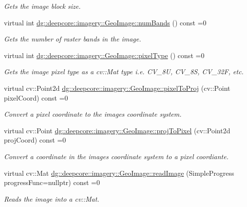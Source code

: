 \begin{DoxyCompactItemize}
\begin{DoxyCompactList}\small\item\em Gets the image block size. \end{DoxyCompactList}\item 
virtual int \hyperlink{group___imagery_module_ga27b0bde15551e580dc658947d7d29f61}{dg\+::deepcore\+::imagery\+::\+Geo\+Image\+::num\+Bands} () const =0
\begin{DoxyCompactList}\small\item\em Gets the number of raster bands in the image. \end{DoxyCompactList}\item 
virtual int \hyperlink{group___imagery_module_ga3cb616a1de3ee19bebfdf14957d90d7c}{dg\+::deepcore\+::imagery\+::\+Geo\+Image\+::pixel\+Type} () const =0
\begin{DoxyCompactList}\small\item\em Gets the image pixel type as a cv\+::\+Mat type i.\+e. C\+V\+\_\+8U, C\+V\+\_\+8S, C\+V\+\_\+32F, etc. \end{DoxyCompactList}\item 
virtual cv\+::\+Point2d \hyperlink{group___imagery_module_ga6ef753bbb1d8a5dfa56a72de21af4f08}{dg\+::deepcore\+::imagery\+::\+Geo\+Image\+::pixel\+To\+Proj} (cv\+::\+Point pixel\+Coord) const =0
\begin{DoxyCompactList}\small\item\em Convert a pixel coordinate to the image\textquotesingle{}s coordinate system. \end{DoxyCompactList}\item 
virtual cv\+::\+Point \hyperlink{group___imagery_module_ga4935502553685c597c803da24f706b99}{dg\+::deepcore\+::imagery\+::\+Geo\+Image\+::proj\+To\+Pixel} (cv\+::\+Point2d proj\+Coord) const =0
\begin{DoxyCompactList}\small\item\em Convert a coordinate in the image\textquotesingle{}s coordinate system to a pixel coordiante. \end{DoxyCompactList}\item 
virtual cv\+::\+Mat \hyperlink{group___imagery_module_ga58e7e5d070e788600714a331c5bdaf02}{dg\+::deepcore\+::imagery\+::\+Geo\+Image\+::read\+Image} (Simple\+Progress progress\+Func=nullptr) const =0
\begin{DoxyCompactList}\small\item\em Reads the image into a cv\+::\+Mat. \end{DoxyCompactList}\item 

\end{DoxyCompactItemize}
